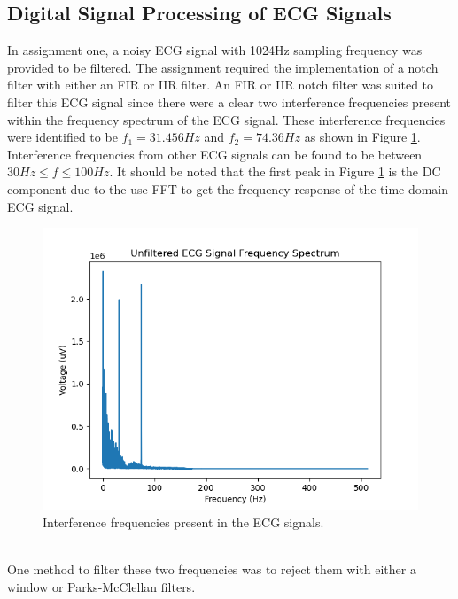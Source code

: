 \documentclass[a4paper, 11pt]{article}
\begin{document}
    \subsection{Digital Signal Processing of ECG Signals}\label{sec:bg_sub1}
        In assignment one, a noisy ECG signal with 1024Hz sampling frequency was provided to be filtered. 
        The assignment required the implementation of a notch filter with either an FIR or IIR filter.
        An FIR or IIR notch filter was suited to filter this ECG signal since there were a clear two 
        interference frequencies present within the frequency spectrum of the ECG signal.
        These interference frequencies were identified to be $f_{1} = 31.456Hz$ and $f_{2} = 74.36Hz$
        as shown in Figure \ref{Fig:rejFreq}. Interference frequencies from other ECG signals can be found to
        be between $30Hz \leqslant f \leqslant 100Hz$. It should be noted that the first peak in Figure \ref{Fig:rejFreq} is the 
        DC component due to the use FFT to get the frequency response of the time domain ECG signal.
        \\
        \begin{figure}[h!]
            \centering
            \graphicspath{{./wiki/}}
            \includegraphics[scale=0.6]{ECG_freq_spectrum.png}
            \caption{Interference frequencies present in the ECG signals.}
            \label{Fig:rejFreq}
        \end{figure}
        \\
        One method to filter these two frequencies was to reject them with either a window or Parks-McClellan filters.
\end{document}
